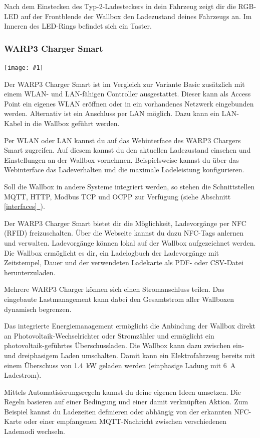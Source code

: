 \documentclass[a4paper,10pt]{article}
\newcommand{\gfx}[1]{\texttt{[image: \#1]}}
\newcommand*{\fullref}[1]{Abschnitt \hyperref[{#1}]{\ref*{#1}~\nameref*{#1}}}
\begin{document}
\begin{multicols*}{2}
    Nach dem Einstecken des Typ-2-Ladesteckers in
    dein Fahrzeug zeigt dir die RGB-LED auf der Frontblende der Wallbox den
    Ladezustand deines Fahrzeugs an. Im Inneren des LED-Rings befindet sich ein Taster.

	\subsubsection*{WARP3 Charger Smart}
	\gfx{./img_warp3/resized/warp3_smart_open}

    Der WARP3 Charger Smart ist im Vergleich zur Variante Basic zusätzlich
	mit einem WLAN- und LAN-fähigen Controller ausgestattet.
    Dieser kann als \nohyphens{Access} Point ein eigenes WLAN eröffnen oder in
    ein vorhandenes Netzwerk eingebunden werden. Alternativ ist ein Anschluss
    per LAN möglich. Dazu kann ein LAN-Kabel in die Wallbox geführt werden.

    Per WLAN oder LAN kannst du auf das Webinterface des WARP3 Chargers Smart
    zugreifen. Auf diesem kannst du den aktuellen Ladezustand einsehen und
    Einstellungen an der Wallbox vornehmen. Beispielsweise kannst du über das Webinterface
    das Ladeverhalten und die maximale Ladeleistung konfigurieren.

	Soll die Wallbox in andere Systeme integriert werden, so stehen die
	Schnittstellen MQTT, HTTP, Modbus TCP und OCPP zur Verfügung
	(siehe \fullref{interfaces}).

    Der WARP3 Charger Smart bietet dir die Möglichkeit, Ladevorgänge
    per NFC (RFID) freizuschalten. Über die Webseite kannst du dazu NFC-Tags
    anlernen und verwalten. Ladevorgänge können lokal auf der Wallbox
	aufgezeichnet werden. Die Wallbox ermöglicht es dir, ein Ladelogbuch der
	Ladevorgänge mit Zeitstempel, Dauer und der verwendeten Ladekarte
	als PDF- oder CSV-Datei herunterzuladen.

	Mehrere WARP3 Charger können sich einen Stromanschluss teilen.
	Das eingebaute Lastmanagement kann dabei den Gesamtstrom aller
	Wallboxen dynamisch begrenzen.

	Das integrierte Energiemanagement ermöglicht die Anbindung der Wallbox
	direkt an Photovoltaik-Wechselrichter oder Stromzähler und ermöglicht ein
	photovoltaik-geführtes Überschussladen. Die Wallbox kann dazu zwischen ein- und dreiphasigem Laden umschalten.
	Damit kann ein Elektrofahrzeug bereits mit einem Überschuss von \SI{1,4}{\kilo\watt} geladen werden
	(einphasige Ladung mit \SI{6}{\ampere} Ladestrom).

	Mittels Automatisierungsregeln kannst du deine eigenen Ideen umsetzen.
	Die Regeln basieren auf einer Bedingung und einer damit verknüpften
	Aktion. Zum Beispiel kannst du Ladezeiten definieren oder abhängig von
	der erkannten NFC-Karte oder einer empfangenen MQTT-Nachricht
	zwischen verschiedenen Lademodi wechseln.


\end{multicols*}
\end{document}
